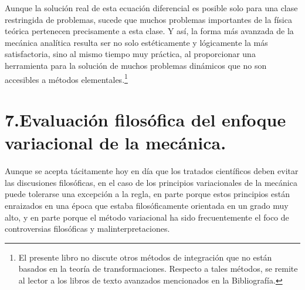 Aunque la solución real de esta ecuación diferencial es posible solo para una clase restringida de problemas, sucede que muchos problemas importantes de la física teórica pertenecen precisamente a esta clase. Y así, la forma más avanzada de la mecánica analítica resulta ser no solo estéticamente y lógicamente la más satisfactoria, sino al mismo tiempo muy práctica, al proporcionar una herramienta para la solución de muchos problemas dinámicos que no son accesibles a métodos elementales.\footnote{El presente libro no discute otros métodos de integración que no están basados en la teoría de transformaciones. Respecto a tales métodos, se remite al lector a los libros de texto avanzados mencionados en la Bibliografía.}

\section*{7.\quad Evaluación filosófica del enfoque variacional de la mecánica.}

Aunque se acepta tácitamente hoy en día que los tratados científicos deben evitar las discusiones filosóficas, en el caso de los principios variacionales de la mecánica puede tolerarse una excepción a la regla, en parte porque estos principios están enraizados en una época que estaba filosóficamente orientada en un grado muy alto, y en parte porque el método variacional ha sido frecuentemente el foco de controversias filosóficas y malinterpretaciones.

